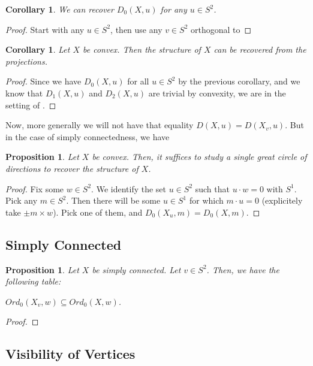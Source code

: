 \documentclass[12pt]{article}
\theoremstyle{theorem}
\newtheorem{corollary}[theorem]{Corollary}
\newtheorem{proposition}[theorem]{Proposition}
\theoremstyle{definition}
\theoremstyle{remark}
\theoremstyle{gremark}
\theoremstyle{discussion}
\theoremstyle{notation}
\begin{document}
	\begin{corollary}
		We can recover $D_0(X,u)$ for any $u\in S^2$.
	\end{corollary}

	\begin{proof}
		Start with any $u\in S^2$, then use any $v\in S^2$ orthogonal to 
	\end{proof}

	\begin{corollary}
		Let $X$ be convex. Then the structure of $X$ can be recovered from the projections.
	\end{corollary}

	\begin{proof}
		Since we have $D_0(X,u)$ for all $u\in S^2$ by the previous corollary, and we know that $D_1(X,u)$ and $D_2(X,u)$ are trivial by convexity, we are in the setting of .
	\end{proof}

	Now, more generally we will not have that equality $D(X,u)=D(X_v,u)$. But in the case of simply connectedness, we have 
	
	\begin{proposition}
		Let $X$ be convex. Then, it suffices to study a single great circle of directions to recover the structure of $X$.
	\end{proposition}

	\begin{proof}
		Fix some $w\in S^2$. We identify the set $u\in S^2$ such that $u\cdot w=0$ with $S^1$. Pick any $m\in S^2$. Then there will be some $u\in S^1$ for which $m\cdot u=0$ (explicitely take $\pm m\times w$). Pick one of them, and $D_0(X_u,m)=D_0(X,m)$.
	\end{proof}

	\subsection{Simply Connected}

	\begin{proposition}
		Let $X$ be simply connected. Let $v\in S^2$. Then, we have the following table:
		
		$Ord_0(X_v, w)\subseteq Ord_0(X,w)$.
	\end{proposition}

	\begin{proof}
		
	\end{proof}
	
	\subsection*{Visibility of Vertices}
	
\end{document}
